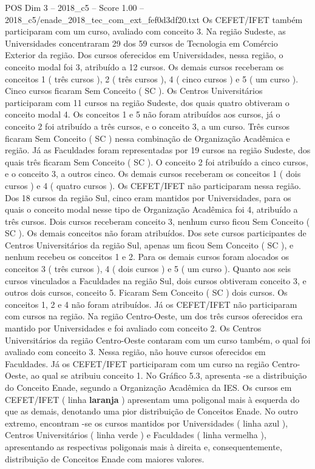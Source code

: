 \begin{textsample}{POS Dim 3 – 2018\_c5 – Score 1.00 – 2018\_c5/enade\_2018\_tec\_com\_ext\_fef0d3df20.txt}
Os CEFET/IFET também participaram com um curso, avaliado com conceito 3.
Na região Sudeste, as Universidades concentraram 29 dos 59 cursos de Tecnologia em Comércio Exterior da região.
Dos cursos oferecidos em Universidades, nessa região, o conceito modal foi 3, atribuído a 12 cursos.
Os demais cursos receberam os conceitos 1 ( três cursos ), 2 ( três cursos ), 4 ( cinco cursos ) e 5 ( um curso ).
Cinco cursos ficaram Sem Conceito ( SC ).
Os Centros Universitários participaram com 11 cursos na região Sudeste, dos quais quatro obtiveram o conceito modal 4.
Os conceitos 1 e 5 não foram atribuídos aos cursos, já o conceito 2 foi atribuído a três cursos, e o conceito 3, a um curso.
Três cursos ficaram Sem Conceito ( SC ) nessa combinação de Organização Acadêmica e região.
Já as Faculdades foram representadas por 19 cursos na região Sudeste, dos quais três ficaram Sem Conceito ( SC ).
O conceito 2 foi atribuído a cinco cursos, e o conceito 3, a outros cinco.
Os demais cursos receberam os conceitos 1 ( dois cursos ) e 4 ( quatro cursos ).
Os CEFET/IFET não participaram nessa região.
Dos 18 cursos da região Sul, cinco eram mantidos por Universidades, para os quais o conceito modal nesse tipo de Organização Acadêmica foi 4, atribuído a três cursos.
Dois cursos receberam conceito 3, nenhum curso ficou Sem Conceito ( SC ).
Os demais conceitos não foram atribuídos.
Dos sete cursos participantes de Centros Universitários da região Sul, apenas um ficou Sem Conceito ( SC ), e nenhum recebeu os conceitos 1 e 2.
Para os demais cursos foram alocados os conceitos 3 ( três cursos ), 4 ( dois cursos ) e 5 ( um curso ).
Quanto aos seis cursos vinculados a Faculdades na região Sul, dois cursos obtiveram conceito 3, e outros dois cursos, conceito 5.
Ficaram Sem Conceito ( SC ) dois cursos.
Os conceitos 1, 2 e 4 não foram atribuídos.
Já os CEFET/IFET não participaram com cursos na região.
Na região Centro-Oeste, um dos três cursos oferecidos era mantido por Universidades e foi avaliado com conceito 2.
Os Centros Universitários da região Centro-Oeste contaram com um curso também, o qual foi avaliado com conceito 3.
Nessa região, não houve cursos oferecidos em Faculdades.
Já os CEFET/IFET participaram com um curso na região Centro-Oeste, ao qual se atribuiu conceito 1.
No Gráfico 5.3, apresenta -se a distribuição do Conceito Enade, segundo a Organização Acadêmica da IES.
Os cursos em CEFET/IFET ( linha \textbf{laranja} ) apresentam uma poligonal mais à esquerda do que as demais, denotando uma pior distribuição de Conceitos Enade.
No outro extremo, encontram -se os cursos mantidos por Universidades ( linha azul ), Centros Universitários ( linha verde ) e Faculdades ( linha vermelha ), apresentando as respectivas poligonais mais à direita e, consequentemente, distribuição de Conceitos Enade com maiores valores.

\end{textsample}
